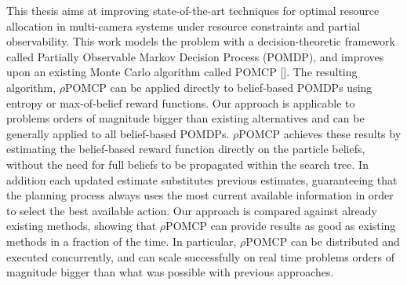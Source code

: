 This thesis aims at improving state-of-the-art techniques for optimal resource allocation in
multi-camera systems under resource constraints and partial observability. This work models the
problem with a decision-theoretic framework called Partially Observable Markov Decision Process
(POMDP), and improves upon an existing Monte Carlo algorithm called POMCP []. The
resulting algorithm, $\rho$POMCP can be applied directly to belief-based POMDPs using entropy or
max-of-belief reward functions. Our approach is applicable to problems orders of magnitude bigger
than existing alternatives and can be generally applied to all belief-based POMDPs. $\rho$POMCP
achieves these results by estimating the belief-based reward function directly on the particle
beliefs, without the need for full beliefs to be propagated within the search tree. In addition each
updated estimate substitutes previous estimates, guaranteeing that the planning process always uses
the most current available information in order to select the best available action. Our approach
is compared against already existing methods, showing that $\rho$POMCP can provide results as good
as existing methods in a fraction of the time. In particular, $\rho$POMCP can be distributed and
executed concurrently, and can scale successfully on real time problems orders of magnitude bigger
than what was possible with previous approaches.
